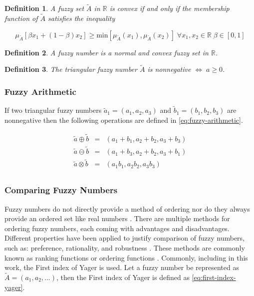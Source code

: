 \documentclass[ee,msthesis]{usuthesis}
\newtheorem{definition}{Definition}[section]
\begin{document}
\begin{definition}
A fuzzy set \(\tilde{A}\) in \(\mathbb{R}\) is convex if and only if the membership function of \(\tilde{A}\) satisfies the inequality

\begin{equation*}
\mu_{\tilde{A}}[\beta x_1 + (1-\beta)x_2] \ge \text{min}[\mu_{\tilde{A}}(x_1), \mu_{\tilde{A}}(x_2)]\; \forall x_1, x_2 \in \mathbb{R}\; \beta \in [0,1]
\end{equation*}
\end{definition}

\begin{definition}
A fuzzy number is a normal and convex fuzzy set in \(\mathbb{R}\).
\end{definition}

\begin{definition}
\label{def:triangular-nonnegative}
The triangular fuzzy number \(\tilde{A}\) is nonnegative \(\iff\; a \ge 0\).
\end{definition}

\subsubsection{Fuzzy Arithmetic}
\label{sec:org7caf6fb}
If two triangular fuzzy numbers \(\tilde{a}_1 = (a_1, a_2, a_3)\) and \(\tilde{b}_1 = (b_1, b_2, b_3)\) are nonnegative
then the following operations are defined in \ref{eq:fuzzy-arithmetic}.

\begin{equation}
\label{eq:fuzzy-arithmetic}
\begin{array}{lcl}
\tilde{a} \oplus \tilde{b} & = & (a_1 + b_1, a_2 + b_2, a_3 + b_3) \\
\tilde{a} \ominus \tilde{b} & = & (a_1 + b_3, a_2 + b_2, a_3 + b_1) \\
\tilde{a} \otimes \tilde{b} & = & (a_1 b_1, a_2 b_2, a_3 b_3)       \\
\end{array}
\end{equation}

\subsubsection{Comparing Fuzzy Numbers}
\label{sec:org71d34f7}
Fuzzy numbers do not directly provide a method of ordering nor do they always provide an ordered set like real numbers
\cite{bello-2019-fuzzy-activ}. There are multiple methods for ordering fuzzy numbers, each coming with advantages and
disadvantages. Different properties have been applied to justify comparison of fuzzy numbers, such as: preference,
rationality, and robustness \cite{jimenez-2007-linear-progr,bello-2019-fuzzy-activ,kaur-2016-introd-fuzzy}. These
methods are commonly known as ranking functions or ordering functions
\cite{bello-2019-fuzzy-activ,das-2016-mathem-model,kaur-2016-introd-fuzzy}. Commonly, including in this work, the
First index of Yager \cite{yager-1981-proced-order} is used. Let a fuzzy number be represented as \(\tilde{A} =
(a_1,a_2,...)\), then the First index of Yager is defined as \ref{eq:first-index-yager}.
\end{document}
